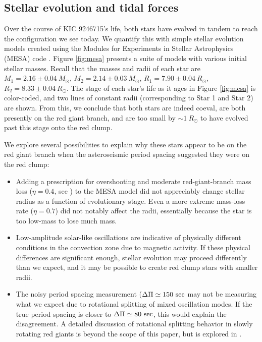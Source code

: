 \subsection{Stellar evolution and tidal forces}\label{tides}

Over the course of KIC 9246715's life, both stars have evolved in tandem to reach the configuration we see today. We quantify this with simple stellar evolution models created using the Modules for Experiments in Stellar Astrophysics (MESA) code \citep{pax11,pax13,pax15}. Figure \ref{fig:mesa} presents a suite of models with various initial stellar masses. Recall that the masses and radii of each star are $M_1 = 2.16 \pm 0.04\ M_{\odot}$, $M_2 = 2.14 \pm 0.03\ M_{\odot}$, $R_1 = 7.90 \pm 0.04 \ R_{\odot}$, $R_2 = 8.33 \pm 0.04 \ R_{\odot}$. The stage of each star's life as it ages in Figure \ref{fig:mesa} is color-coded, and two lines of constant radii (corresponding to Star 1 and Star 2) are shown. From this, we conclude that both stars are indeed coeval, are both presently on the red giant branch, and are too small by $\sim 1 \ R_\odot$ to have evolved past this stage onto the red clump.

We explore several possibilities to explain why these stars appear to be on the red giant branch when the asteroseismic period spacing suggested they were on the red clump:
\begin{itemize}
\item Adding a prescription for overshooting and moderate red-giant-branch mass loss ($\eta = 0.4$, see \citet{mig12}) to the MESA model did not appreciably change stellar radius as a function of evolutionary stage. Even a more extreme mass-loss rate ($\eta = 0.7$) did not notably affect the radii, essentially because the star is too low-mass to lose much mass.
\item Low-amplitude solar-like oscillations are indicative of physically different conditions in the convection zone due to magnetic activity. If these physical differences are significant enough, stellar evolution may proceed differently than we expect, and it may be possible to create red clump stars with smaller radii.
\item The noisy period spacing measurement ($\Delta \Pi \simeq 150 \ \rm{sec}$ may not be measuring what we expect due to rotational splitting of mixed oscillation modes. If the true period spacing is closer to $\Delta \Pi \simeq 80 \ \rm{sec}$, this would explain the disagreement. A detailed discussion of rotational splitting behavior in slowly rotating red giants is beyond the scope of this paper, but is explored in \citet{gou13}.
\end{itemize}

